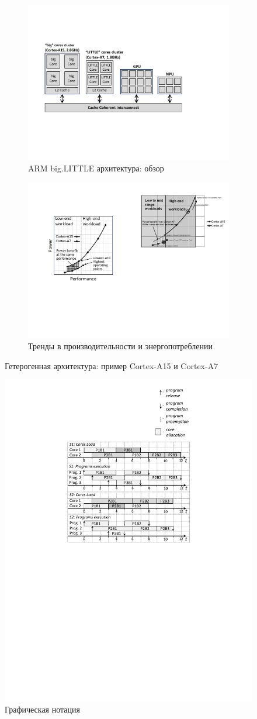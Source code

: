 \begin{figure}
\begin{subfigure}{.85\columnwidth}
\includegraphics[width=1\linewidth]{figs/bigLITTLEArchitecture.pdf}
\vspace{1mm}
\caption{ARM big.LITTLE архитектура: обзор}
\label{fig:bigLITTLEArchitecture}
\end{subfigure}

\begin{subfigure}{.95\columnwidth}
\includegraphics[width=.4\linewidth]{figs/CortexA15vsA7Comparison.pdf}
\vspace{1mm}
\caption{Тренды в производительности и энергопотреблении}
\label{fig:CortexA15A7Comparison}
\end{subfigure}
\caption{Гетерогенная архитектура: пример Cortex-A15 и Cortex-A7}
\end{figure}

\begin{figure}
\centering
\includegraphics[width=.18\columnwidth]{figs/notation.pdf}
\caption{Графическая нотация}
\label{fig:notation}
\end{figure}


